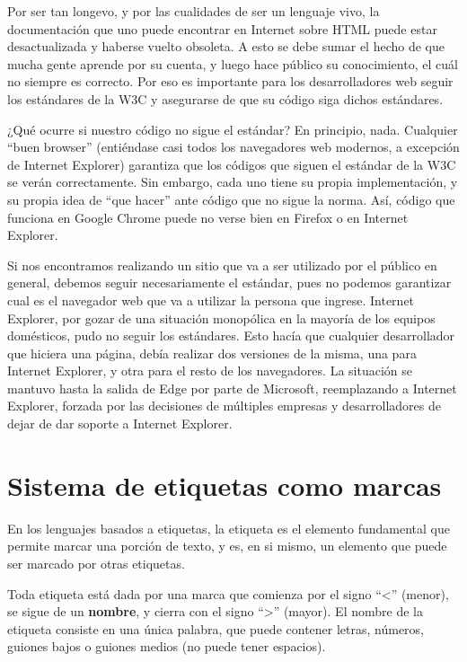 Por ser tan longevo, y por las cualidades de ser un lenguaje vivo, la documentación
que uno puede encontrar en Internet sobre HTML puede estar desactualizada y haberse
vuelto obsoleta. A esto se debe sumar el hecho de que mucha gente aprende por su
cuenta, y luego hace público su conocimiento, el cuál no siempre es correcto. Por
eso es importante para los desarrolladores web seguir los estándares de la W3C y
asegurarse de que su código siga dichos estándares.

¿Qué ocurre si nuestro código no sigue el estándar? En principio, nada.
Cualquier ``buen browser'' (entiéndase casi todos los navegadores web modernos,
a excepción de Internet Explorer) garantiza que los códigos que siguen el
estándar de la W3C se verán correctamente. Sin embargo, cada uno tiene su
propia implementación, y su propia idea de ``que hacer'' ante código que no
sigue la norma. Así, código que funciona en Google Chrome puede no verse bien
en Firefox o en Internet Explorer. 

Si nos encontramos realizando un sitio que va a ser utilizado por el público en
general, debemos seguir necesariamente el estándar, pues no podemos garantizar
cual es el navegador web que va a utilizar la persona que ingrese. Internet
Explorer, por gozar de una situación monopólica en la mayoría de los equipos
domésticos, pudo no seguir los estándares. Esto hacía que cualquier desarrollador
que hiciera una página, debía realizar dos versiones de la misma, una para
Internet Explorer, y otra para el resto de los navegadores. La situación se
mantuvo hasta la salida de Edge por parte de Microsoft, reemplazando a Internet
Explorer, forzada por las decisiones de múltiples empresas y desarrolladores de
dejar de dar soporte a Internet Explorer.

\section{Sistema de etiquetas como marcas}

En los lenguajes basados a etiquetas, la etiqueta es el elemento fundamental
que permite marcar una porción de texto, y es, en si mismo, un elemento que
puede ser marcado por otras etiquetas.

Toda etiqueta está dada por una marca que comienza por el signo ``<'' (menor),
se sigue de un \textbf{nombre}, y cierra con el signo ``>'' (mayor). El nombre
de la etiqueta consiste en una única palabra, que puede contener letras, números,
guiones bajos o guiones medios (no puede tener espacios).

